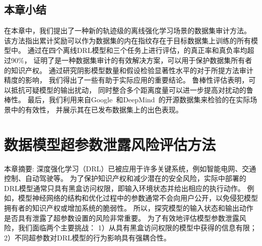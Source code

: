 \section{本章小结}
在本章中，我们提出了一种新的轨迹级的离线强化学习场景的数据集审计方法。
该方法指出累计奖励可以作为数据集的内在指纹存在于目标数据集上训练的所有模型中。
通过在四个离线DRL模型和三个任务上进行评估，\sysnameo 的真正率和真负率均超过90\%，
证明了\sysnameo 是一种数据集审计的有效解决方案，可以用于保护数据集所有者的知识产权。
通过研究阴影模型数量和假设检验显著性水平的对于所提方法审计精度的影响，
我们得出了一些有助于实际应用\sysnameo 的重要结论。
鲁棒性评估表明，\sysnameo 可以抵抗可疑模型的输出扰动，
同时整合多个距离度量可以进一步提高\sysnameo 对扰动的鲁棒性。
最后，我们利用来自Google~\cite{DBLP:conf/nips/Pomerleau88}和DeepMind~\cite{DBLP:conf/nips/Gulcehre0NPCZAM20}的开源数据集来检验\sysnameo 的在实际场景中的有效性，
并展示其在已发布数据集上的出色表现。




\chapter{数据模型超参数泄露风险评估方法}
本章摘要: 
深度强化学习（DRL）已被应用于许多关键系统，例如智能电网、交通控制、自动驾驶等。
为了保护知识产权和减少潜在的安全风险，实际中部署的DRL模型通常只具有黑盒访问权限，即输入环境状态并给出相应的执行动作。
例如，模型神经网络的结构和优化过程中的参数通常不会向用户公开，以免侵犯模型拥有者的知识产权或增加系统的脆弱性。
所以，探究模型的输入状态和输出动作是否具有泄露了超参数设置的风险非常重要。
为了有效地评估模型参数泄露风险，我们面临两个主要挑战：
1）从具有黑盒访问权限的模型中获得的信息有限；
2）不同超参数对DRL模型的行为影响具有强耦合性。

